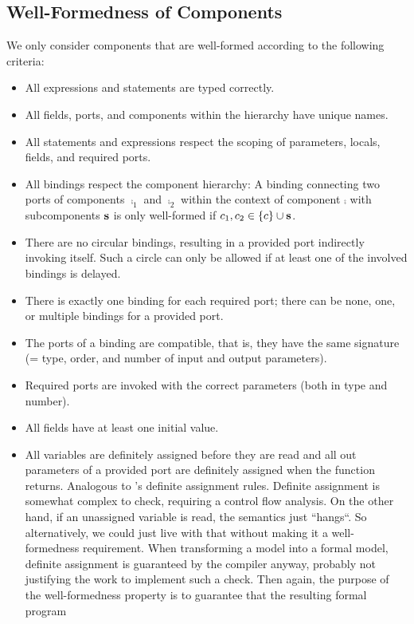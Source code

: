 \documentclass[a4paper,10pt,english]{article}
\begin{document}
\subsection{Well-Formedness of Components}
We only consider components that are well-formed according to the following criteria:
\begin{itemize}
	\item All expressions and statements are typed correctly.
	\item All fields, ports, and components within the hierarchy have unique names.
	\item All statements and expressions respect the scoping of parameters, locals, fields, and required ports.
	\item All bindings respect the component hierarchy: A binding connecting two ports of components $\comp_1$ and $\comp_2$ within
	the context of component $\comp$ with subcomponents $\mathbf{s}$ is only well-formed if $c_1, c_2 \in \{ c \} \cup
	\mathbf{s}$.
	\item There are no circular bindings, resulting in a provided port indirectly invoking itself. Such a circle can only be allowed
	if at least one of the involved bindings is delayed.
	\item There is exactly one binding for each required port; there can be none, one, or multiple bindings for a provided port.
	\item The ports of a binding are compatible, that is, they have the same signature (= type, order, and number of input and
	output parameters).
	\item Required ports are invoked with the correct parameters (both in type and number).
	\item All fields have at least one initial value.
	\item All variables are definitely assigned before they are read and all out parameters of a provided port are definitely
	assigned when the function returns. Analogous to \CSharp's definite assignment rules. Definite assignment is somewhat complex to
	check, requiring a control flow analysis. On the other hand, if an unassigned variable is read, the semantics just ``hangs``.
	So alternatively, we could just live with that without making it a well-formedness requirement. When transforming a \SSharp
	model into a formal model, definite assignment is guaranteed by the \CSharp compiler anyway, probably not justifying the work to
	implement such a check. Then again, the purpose of the well-formedness property is to guarantee that the resulting formal program

\end{itemize}
\end{document}
